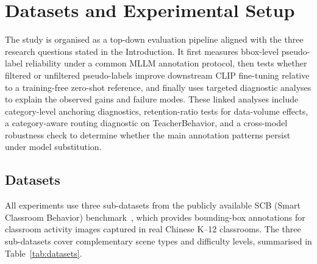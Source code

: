 \documentclass{ieeeaccess}
\begin{document}
\section{Datasets and Experimental Setup}
\label{sec:method}

The study is organised as a top-down evaluation pipeline aligned with
the three research questions stated in the Introduction.
It first measures bbox-level pseudo-label reliability under a common
MLLM annotation protocol, then tests whether filtered or unfiltered
pseudo-labels improve downstream CLIP fine-tuning relative to a
training-free zero-shot reference, and finally uses targeted diagnostic
analyses to explain the observed gains and failure modes.
These linked analyses include category-level anchoring diagnostics,
retention-ratio tests for data-volume effects, a category-aware routing
diagnostic on TeacherBehavior, and a cross-model robustness check to
determine whether the main annotation patterns persist under model
substitution.

\subsection{Datasets}
\label{sec:datasets}

All experiments use three sub-datasets from the publicly available
SCB (Smart Classroom Behavior) benchmark~\cite{scb_dataset}, which
provides bounding-box annotations for classroom activity images
captured in real Chinese K--12 classrooms.
The three sub-datasets cover complementary scene types and difficulty
levels, summarised in Table~\ref{tab:datasets}.

\begin{table}[!t]
\caption{Overview of the three SCB sub-datasets used in this study.
``BB'' = bounding boxes.}
\label{tab:datasets}
\centering
{}
\end{table}
\end{document}
